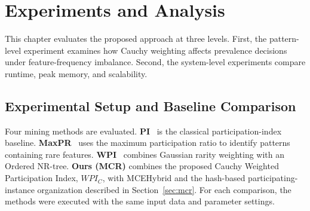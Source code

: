 \documentclass[12pt, letterpaper]{template}
\newcommand{\minprev}{\mathit{minprev}}
\theoremstyle{definition}
\begin{document}
%
%

\section{Experiments and Analysis}
\label{chap:experiments}

This chapter evaluates the proposed approach at three levels. First, the
pattern-level experiment examines how Cauchy weighting affects prevalence
decisions under feature-frequency imbalance. Second, the system-level
experiments compare runtime, peak memory, and scalability.

\subsection{Experimental Setup and Baseline Comparison}
\label{sec:exp_setup}

Four mining methods are evaluated. \textbf{PI}~\cite{yoo2006joinless} is the
classical participation-index baseline. \textbf{MaxPR}~\cite{huang2006mining}
uses the maximum participation ratio to identify patterns containing rare
features. \textbf{WPI}~\cite{yang2021efficient} combines Gaussian rarity
weighting with an Ordered NR-tree. \textbf{Ours (MCR)} combines the proposed
Cauchy Weighted Participation Index, $WPI_C$, with MCEHybrid and the hash-based
participating-instance organization described in Section~\ref{sec:mcr}. For
each comparison, the methods were executed with the same input data and
parameter settings.
\end{document}

